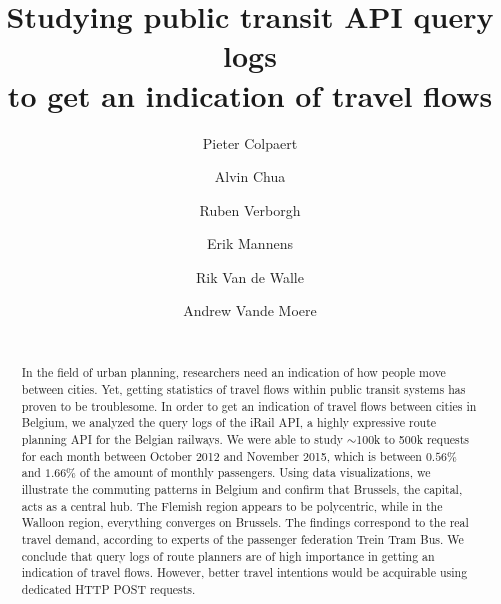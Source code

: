 \documentclass{sig-alternate}
\begin{document}
\title{Studying public transit API query logs\\ to get an indication of travel flows}
\author{
\alignauthor
Pieter Colpaert\\
\and
\alignauthor
Alvin Chua\\
\and
\alignauthor
Ruben Verborgh\\
\and
\alignauthor
Erik Mannens\\
\and
\alignauthor
Rik Van de Walle\\
\and
\alignauthor
Andrew Vande Moere\\
\\
}

\maketitle
\begin{abstract}

In the field of urban planning, researchers need an indication of how people move between cities. 
Yet, getting statistics of travel flows within public transit systems has proven to be troublesome.
In order to get an indication of travel flows between cities in Belgium,
we analyzed the query logs of the iRail API, a highly expressive route planning API for the Belgian railways.
We were able to study $\sim$100k to 500k requests for each month between October 2012 and November 2015, which is between $0.56\%$ and $1.66\%$ of the amount of monthly passengers.
Using data visualizations, we illustrate the commuting patterns in Belgium and confirm that Brussels, the capital, acts as a central hub. 
The Flemish region appears to be polycentric, while in the Walloon region, everything converges on Brussels.
The findings correspond to the real travel demand, according to experts of the passenger federation Trein Tram Bus.
We conclude that query logs of route planners are of high importance in getting an indication of travel flows.
However, better travel intentions would be acquirable using dedicated HTTP POST requests.

\end{abstract}
\end{document}

